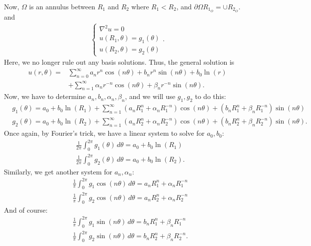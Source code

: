\documentclass{book}
\theoremstyle{definition}
\newcommand{\p}{\partial}
\newcommand{\f}[2]{\frac{#1}{#2}}
\begin{document}
Now, $\Omega$ is an annulus between $R_1 $ and $R_2$ where $R_1 < R_2$, and $\p \Omega R_{1_{O}} =   \cup R_{2_{O}}$. and  
\begin{align*}
\begin{cases}
\nabla^2 u = 0\\
u(R_1,\theta) = g_1(\theta)\\
u(R_2,\theta) = g_2(\theta)
\end{cases}.
\end{align*}
Here, we no longer rule out any basis solutions. Thus, the general solution is
\begin{align*}
u(r,\theta) =& \sum^\infty_{n=0} a_n r^n \cos(n\theta) + b_n r^{n}\sin(n\theta) + b_0\ln(r) \\
&+\sum^\infty_{n=1}\alpha_n r^{-n}\cos(n\theta) + \beta_n r^{-n}\sin(n\theta). 
\end{align*}
Now, we have to determine $a_n, b_n, \alpha_n, \beta_n$, and we will use $g_1, g_2$ to do this: 
\begin{align*}
&g_1(\theta) = a_0 + b_0\ln(R_1) + \sum^\infty_{n=1}(a_n R_1^n + \alpha_n R_1^{-n})\cos(n\theta) + (b_n R_1^n + \beta_n R_1^{-n})\sin(n\theta)\\
&g_2(\theta) = a_0 + b_0\ln(R_2) + \sum^\infty_{n=1}(a_n R_2^n + \alpha_n R_2^{-n})\cos(n\theta) + (b_n R_2^n + \beta_n R_2^{-n})\sin(n\theta).
\end{align*}
Once again, by Fourier's trick, we have a linear system to solve for $a_0, b_0$:
\begin{align*}
&\f{1}{2\pi}\int^{2\pi}_0g_1(\theta)\,d\theta = a_0 + b_0 \ln(R_1)\\
&\f{1}{2\pi}\int^{2\pi}_0g_2(\theta)\,d\theta = a_0 + b_0 \ln(R_2).
\end{align*}
Similarly, we get another system for $a_n, \alpha_n$:
\begin{align*}
&\f{1}{\pi}\int^{2\pi}_0 g_1\cos(n\theta)\,d\theta = a_n R_1^n + \alpha_n R_1^{-n}\\
&\f{1}{\pi}\int^{2\pi}_0 g_2\cos(n\theta)\,d\theta = a_n R_2^n + \alpha_n R_2^{-n}
\end{align*}
And of course:
\begin{align*}
&\f{1}{\pi}\int^{2\pi}_0 g_1\sin(n\theta)\,d\theta = b_n R_1^n + \beta_n R_1^{-n}\\
&\f{1}{\pi}\int^{2\pi}_0 g_2\sin(n\theta)\,d\theta = b_n R_2^n + \beta_n R_2^{-n}.
\end{align*}
\end{document}
